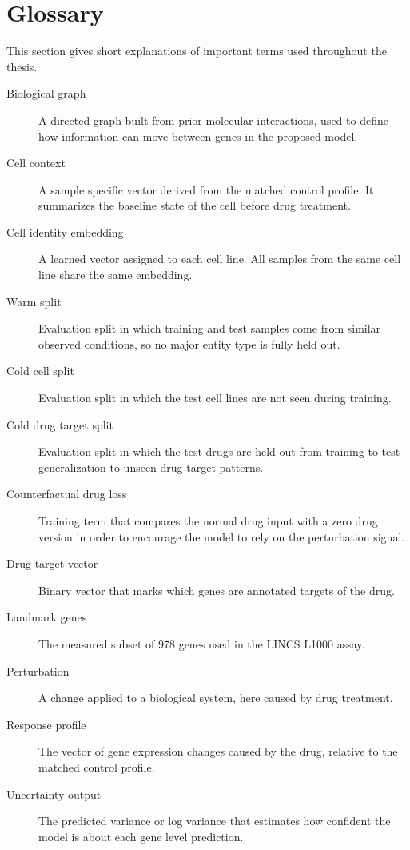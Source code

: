 \chapter*{Glossary}
{}

\noindent This section gives short explanations of important terms used throughout the thesis.

\begin{description}
\item[Biological graph] A directed graph built from prior molecular interactions, used to define how information can move between genes in the proposed model.
\item[Cell context] A sample specific vector derived from the matched control profile. It summarizes the baseline state of the cell before drug treatment.
\item[Cell identity embedding] A learned vector assigned to each cell line. All samples from the same cell line share the same embedding.
\item[Warm split] Evaluation split in which training and test samples come from similar observed conditions, so no major entity type is fully held out.
\item[Cold cell split] Evaluation split in which the test cell lines are not seen during training.
\item[Cold drug target split] Evaluation split in which the test drugs are held out from training to test generalization to unseen drug target patterns.
\item[Counterfactual drug loss] Training term that compares the normal drug input with a zero drug version in order to encourage the model to rely on the perturbation signal.
\item[Drug target vector] Binary vector that marks which genes are annotated targets of the drug.
\item[Landmark genes] The measured subset of 978 genes used in the LINCS L1000 assay.
\item[Perturbation] A change applied to a biological system, here caused by drug treatment.
\item[Response profile] The vector of gene expression changes caused by the drug, relative to the matched control profile.
\item[Uncertainty output] The predicted variance or log variance that estimates how confident the model is about each gene level prediction.
\end{description}
